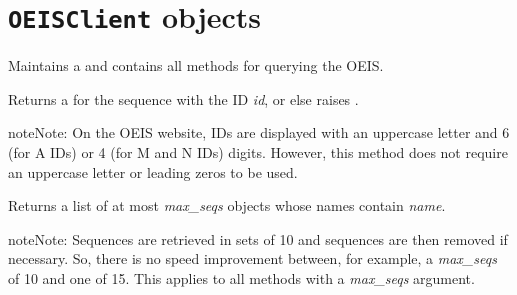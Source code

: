 \documentclass[letterpaper,10pt,english]{sphinxmanual}
\begin{document}
\section{\texttt{OEISClient} objects}
\label{api:oeisclient-objects}

\begin{fulllineitems}
\label{api:client.OEISClient}
Maintains a \href{http://docs.python-requests.org/en/latest/api/\#requests.Session}{} and
contains all methods for querying the OEIS.

\begin{fulllineitems}
\label{api:OEISClient.get_by_id}
Returns a {\hyperref[api:sequence.Sequence]{\emph{}}} for the sequence with the
ID \emph{id}, or else raises {\hyperref[api:errors.NoResultsError]{\emph{}}}.

\begin{notice}{note}{Note:}
On the OEIS website, IDs are displayed with an uppercase letter and 6
(for A IDs) or 4 (for M and N IDs) digits. However, this method does not
require an uppercase letter or leading zeros to be used.
\end{notice}

\end{fulllineitems}


\begin{fulllineitems}
\label{api:OEISClient.lookup_by_name}
Returns a list of at most \emph{max\_seqs} {\hyperref[api:sequence.Sequence]{\emph{}}}
objects whose names contain \emph{name}.

\begin{notice}{note}{Note:}
Sequences are retrieved in sets of 10 and sequences are then removed if
necessary. So, there is no speed improvement between, for example, a
\emph{max\_seqs} of 10 and one of 15. This applies to all methods with a
\emph{max\_seqs} argument.
\end{notice}

\end{fulllineitems}



\end{fulllineitems}
\end{document}
